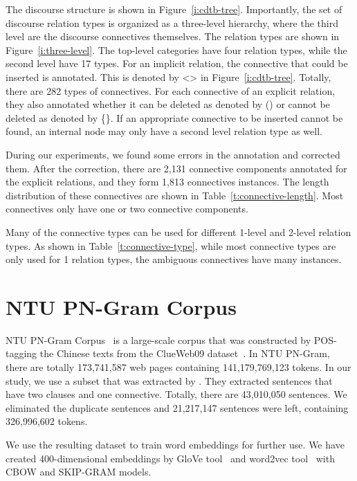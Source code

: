 The discourse structure is shown in Figure~\ref{i:cdtb-tree}. Importantly,
the set of discourse relation types is organized as a three-level hierarchy,
where the third level are the discourse connectives themselves. The relation
types are shown in Figure~\ref{i:three-level}. The top-level categories have
four relation types, while the second level have 17 types. For an implicit
relation, the connective that could be inserted is annotated. This is denoted
by <> in Figure~\ref{i:cdtb-tree}. Totally, there are 282 types of connectives.
For each connective of an explicit relation,
they also annotated whether it can be deleted as denoted by () or cannot be
deleted as denoted by \{\}.
If an appropriate connective to be inserted cannot be found, an internal
node may only have a second level relation type as well.





During our experiments, we found some errors in the annotation and corrected
them. After the correction, there are 2,131 connective components annotated
for the explicit relations, and they form 1,813 connectives instances. The length
distribution of these connectives are shown in Table~\ref{t:connective-length}.
Most connectives only have one or two connective components.



Many of the connective types can be used for different 1-level and 2-level
relation types. As shown in Table~\ref{t:connective-type}, while most connective
types are only used for 1 relation types, the ambiguous connectives have many
instances.



\section{NTU PN-Gram Corpus}

NTU PN-Gram Corpus~\citep{yu2012development} is a large-scale corpus that was
constructed by POS-tagging the Chinese texts from the ClueWeb09
dataset~\citep{callan2009clueweb09}. In NTU PN-Gram, there are totally 173,741,587
web pages containing 141,179,769,123 tokens. In our study, we use a subset that
was extracted by \cite{huang2014interpretation}. They extracted sentences that
have two clauses and one connective. Totally, there are 43,010,050 sentences.
We eliminated the duplicate sentences and 21,217,147 sentences were left, containing
326,996,602 tokens.

We use the resulting dataset to train word embeddings for further use.
We have created 400-dimensional embeddings by GloVe tool~\citep{pennington2014glove}
and word2vec tool~\citep{mikolov2013efficient,mikolov2013distributed} with CBOW and
SKIP-GRAM models.
